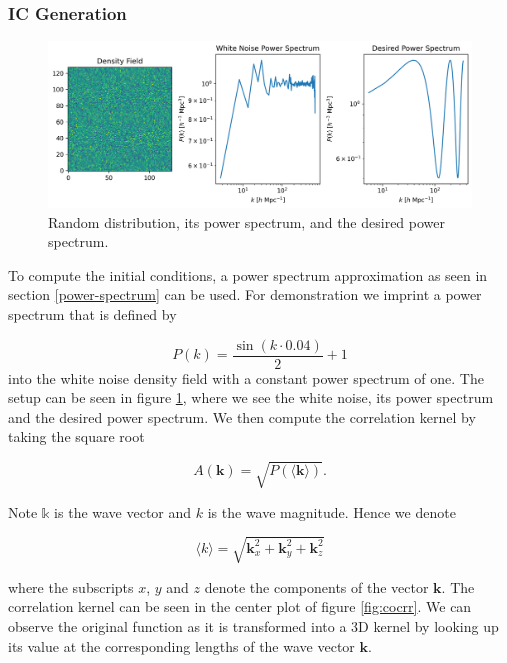 \documentclass{article}
\begin{document}
\subsubsection{IC Generation}


\begin{figure}[h]
    \centering
    \includegraphics[width=0.7\linewidth]{img/IC_sine_setup.png}
   \caption{Random distribution, its power spectrum, and the desired power spectrum.}
\label{fig:random}
\end{figure}

To compute the initial conditions, a power spectrum approximation as seen in section \ref{power-spectrum} can be used. For demonstration we imprint a power spectrum that is defined by

\begin{equation}
    P(k) = \frac{\sin(k \cdot 0.04)}{2} + 1
\end{equation}
into the white noise density field with a constant power spectrum of one. The setup can be seen in figure \ref{fig:random}, where we see the white noise, its power spectrum and the desired power spectrum. We then compute the correlation kernel by taking the square root \citep{prunet2008initial}

\begin{equation}
    A(\mathbf{k}) = \sqrt{P(\langle \mathbf{k} \rangle)}.
\end{equation}

Note $\mathbb{k}$ is the wave vector and $k$ is the wave magnitude. Hence we denote

\begin{equation}
    \langle k \rangle = \sqrt{\mathbf{k}_x^2 + \mathbf{k}_y^2 + \mathbf{k}_z^2}
\end{equation}

where the subscripts $x$, $y$ and $z$ denote the components of the vector $\mathbf{k}$. The correlation kernel can be seen in the center plot of figure \ref{fig:cocrr}. We can observe the original function as it is transformed into a 3D kernel by looking up its value at the corresponding lengths of the wave vector $\mathbf{k}$.
\end{document}
